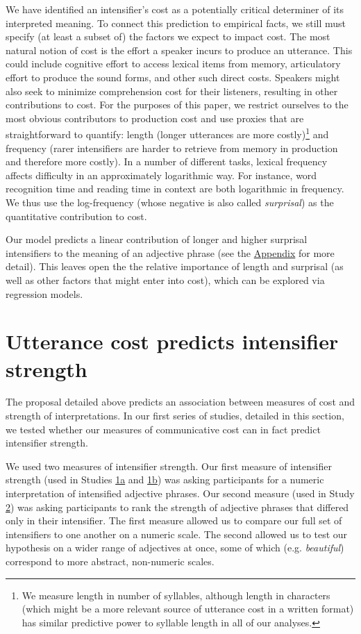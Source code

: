 \documentclass[10pt,letterpaper]{article}
\newcommand{\w}[1]{\emph{#1}}
\begin{document}
We have identified an intensifier's cost as a potentially critical determiner of its interpreted meaning.
To connect this prediction to empirical facts, we still must specify (at least a subset of) the factors we expect to impact cost.
The most natural notion of cost is the effort a speaker incurs to produce an utterance. 
This could include cognitive effort to access lexical items from memory, articulatory effort to produce  the sound forms, and other such direct costs.
Speakers might also seek to minimize comprehension cost for their listeners, resulting in other contributions to cost. 
For the purposes of this paper, we restrict ourselves to the most obvious contributors to production cost and use proxies that are straightforward to quantify: length (longer utterances are more costly)\footnote{
  We measure length in number of syllables, although length in characters (which might be a more relevant source of utterance cost in a written format) has similar predictive power to syllable length in all of our analyses.
}
and frequency (rarer intensifiers are harder to retrieve from memory in production and therefore more costly).
In a number of different tasks, lexical frequency affects difficulty in an approximately logarithmic way.
For instance, word recognition time \cite{mccusker_determinants_1977} and reading time in context \cite{smith_effect_2013} are both logarithmic in frequency.
We thus use the log-frequency (whose negative is also called \emph{surprisal}) as the quantitative contribution to cost.

Our model predicts a linear contribution of longer and higher surprisal intensifiers to the meaning of an adjective phrase (see the \hyperref[app:model]{Appendix} for more detail). 
This leaves open the the relative importance of length and surprisal (as well as other factors that might enter into cost), which can be explored via regression models.

\section{Utterance cost predicts intensifier strength}

The proposal detailed above predicts an association between measures of cost and strength of interpretations.
In our first series of studies, detailed in this section, we tested whether our measures of communicative cost can in fact predict intensifier strength.

We used two measures of intensifier strength.
Our first measure of intensifier strength (used in Studies \hyperref[sec:study1a]{1a} and \hyperref[sec:study1b]{1b}) was asking participants for a numeric interpretation of intensified adjective phrases.
Our second measure (used in Study \hyperref[sec:study2]{2}) was asking participants to rank the strength of adjective phrases that differed only in their intensifier.
The first measure allowed us to compare our full set of intensifiers to one another on a numeric scale.
The second allowed us to test our hypothesis on a wider range of adjectives at once, some of which (e.g. \w{beautiful}) correspond to more abstract, non-numeric scales.
\end{document}
